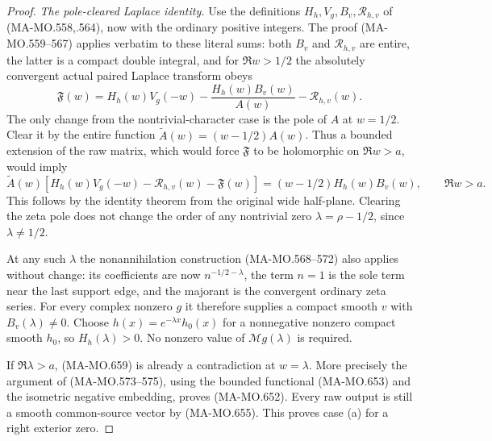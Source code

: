\begin{proof}
\emph{The pole-cleared Laplace identity.}
Use the definitions \(H_h,V_g,B_v,\mathcal R_{h,v}\) of
(MA-MO.558,.564), now with the ordinary positive integers.
The proof (MA-MO.559--567) applies verbatim to these literal
sums: both \(B_v\) and \(\mathcal R_{h,v}\) are entire,
the latter is a compact double integral, and for \(\Re w>1/2\)
the absolutely convergent actual paired Laplace transform obeys
\[
 \mathfrak F(w)=H_h(w)V_g(-w)
             -\frac{H_h(w)B_v(w)}{A(w)}-\mathcal R_{h,v}(w).
 \tag{MA-MO.658}
\]
The only change from the nontrivial-character case is the pole
of \(A\) at \(w=1/2\). Clear it by the entire function
\(\widetilde A(w)=(w-1/2)A(w)\). Thus a bounded extension
of the raw matrix, which would force \(\mathfrak F\) to be
holomorphic on \(\Re w>a\), would imply
\[
 \widetilde A(w)
  [H_h(w)V_g(-w)-\mathcal R_{h,v}(w)-\mathfrak F(w)]
       =(w-1/2)H_h(w)B_v(w),\qquad \Re w>a.
 \tag{MA-MO.659}
\]
This follows by the identity theorem from the original wide
half-plane. Clearing the zeta pole does not change the order
of any nontrivial zero \(\lambda=\rho-1/2\), since
\(\lambda\ne1/2\).

At any such \(\lambda\) the nonannihilation construction
(MA-MO.568--572) also applies without change: its coefficients
are now \(n^{-1/2-\lambda}\), the term \(n=1\) is the sole
term near the last support edge, and the majorant is the
convergent ordinary zeta series. For every complex nonzero
\(g\) it therefore supplies a compact smooth \(v\) with
\(B_v(\lambda)\ne0\). Choose
\(h(x)=e^{-\lambda x}h_0(x)\) for a nonnegative nonzero
compact smooth \(h_0\), so \(H_h(\lambda)>0\).
No nonzero value of \(\mathcal Mg(\lambda)\) is required.

If \(\Re\lambda>a\), (MA-MO.659) is already a contradiction
at \(w=\lambda\). More precisely the argument of
(MA-MO.573--575), using the bounded functional (MA-MO.653)
and the isometric negative embedding, proves (MA-MO.652).
Every raw output is still a smooth common-source vector by
(MA-MO.655). This proves case (a) for a right exterior zero.


\end{proof}
